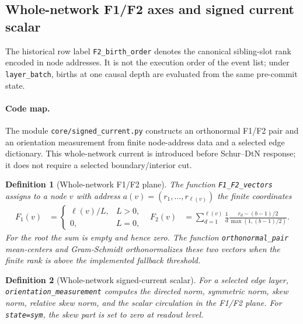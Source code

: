 \documentclass[11pt]{article}
\newtheorem{definition}{Definition}[section]
\theoremstyle{remark}
\newcommand{\code}[1]{\texttt{#1}}
\numberwithin{equation}{section}
\begin{document}
\subsection{Whole-network F1/F2 axes and signed current scalar}
The historical row label \code{F2\_birth\_order} denotes the canonical sibling-slot rank encoded in node addresses. It is not the execution order of the event list; under \code{layer\_batch}, births at one causal depth are evaluated from the same pre-commit state.

\paragraph{Code map.} The module \code{core/signed\_\allowbreak{}current.py} constructs an orthonormal F1/F2 pair and an orientation measurement from finite node-address data and a selected edge dictionary. This whole-network current is introduced before Schur--DtN response; it does not require a selected boundary/interior cut.

\begin{definition}[Whole-network F1/F2 plane]
The function \code{F1\_F2\_vectors} assigns to a node $v$ with address $a(v)=(r_1,\ldots,r_{\ell(v)})$ the finite coordinates
\begin{equation}
\begin{aligned}
  F_1(v)&=\begin{cases}
    \ell(v)/L, & L>0,\\
    0, & L=0,
  \end{cases}
  &
  F_2(v)&=\sum_{d=1}^{\ell(v)}\frac{1}{d}
  \frac{r_d-(b-1)/2}{\max(1,(b-1)/2)}.
\end{aligned}
\label{eq:whole-network-f1-f2-fields}
\end{equation}
For the root the sum is empty and hence zero. The function \code{orthonormal\_pair} mean-centers and Gram-Schmidt orthonormalizes these two vectors when the finite rank is above the implemented fallback threshold.
\end{definition}

\begin{definition}[Whole-network signed-current scalar]
For a selected edge layer, \code{orientation\_\allowbreak{}measurement} computes the directed norm, symmetric norm, skew norm, relative skew norm, and the scalar circulation in the F1/F2 plane. For \code{state=sym}, the skew part is set to zero at readout level.
\end{definition}
\end{document}
